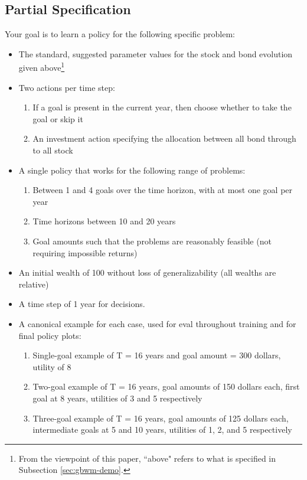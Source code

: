 \documentclass[mnsc,sglanonrev]{informs4}
\begin{document}
\begin{APPENDICES}
\subsection{Partial Specification}

Your goal is to learn a policy for the following specific problem:
\begin{itemize}
    \item The standard, suggested parameter values for the stock and bond evolution given above\footnote{From the viewpoint of this paper, ``above" refers to what is specified in Subsection \ref{sec:gbwm-demo}.}
    \item Two actions per time step:
        \begin{enumerate}
            \item If a goal is present in the current year, then choose whether to take the goal or skip it
            \item An investment action specifying the allocation between all bond through to all stock
        \end{enumerate}
    \item A single policy that works for the following range of problems:
        \begin{enumerate}
            \item Between 1 and 4 goals over the time horizon, with at most one goal per year
            \item Time horizons between 10 and 20 years
            \item Goal amounts such that the problems are reasonably feasible (not requiring impossible returns)
        \end{enumerate}
    \item An initial wealth of 100 without loss of generalizability (all wealths are relative)
    \item A time step of 1 year for decisions.
    \item A canonical example for each case, used for eval throughout training and for final policy plots:
        \begin{enumerate}
            \item Single-goal example of T = 16 years and goal amount = 300 dollars, utility of 8
            \item Two-goal example of T = 16 years, goal amounts of 150 dollars each, first goal at 8 years, utilities of 3 and 5 respectively
            \item Three-goal example of T = 16 years, goal amounts of 125 dollars each, intermediate goals at 5 and 10 years, utilities of 1, 2, and 5 respectively

\end{enumerate}
\end{itemize}
\end{APPENDICES}
\end{document}
